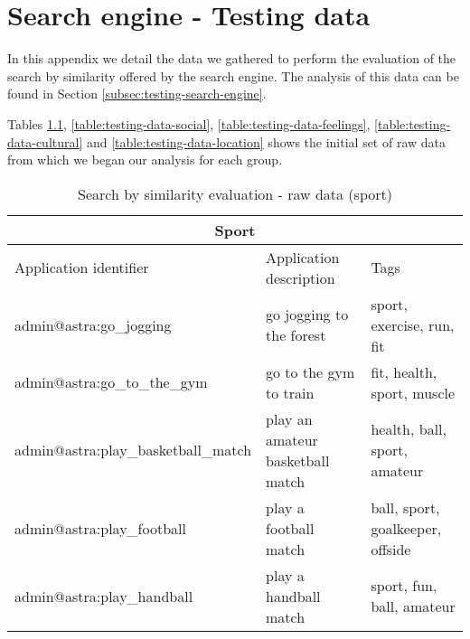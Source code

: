 \chapter{Search engine - Testing data}
\label{appendix:testing-search-engine-data}

In this appendix we detail the data we gathered to perform the evaluation of
the search by similarity offered by the search engine. The analysis of this
data can be found in Section \ref{subsec:testing-search-engine}.

Tables \ref{table:testing-data-sport}, \ref{table:testing-data-social},
\ref{table:testing-data-feelings}, \ref{table:testing-data-cultural} and
\ref{table:testing-data-location} shows the initial set of raw data from which
we began our analysis for each group.

\begin{table}[h!]
	\tiny
    \begin{center}
		\begin{tabular}{||l|l|l||}

		\hline \hline
		\multicolumn{3}{||c||}{\bfseries{Sport}} \\
		\hline \hline
			Application identifier & Application description & Tags \\
			\hline \hline
			admin@astra:go\_jogging	& go jogging to the forest & sport, exercise, run,
			fit\\
			\hline
			admin@astra:go\_to\_the\_gym & go to the gym to train & fit, health, sport,
			muscle\\
			\hline
			admin@astra:play\_basketball\_match & play an amateur basketball match &
			health, ball, sport, amateur\\
			\hline
			admin@astra:play\_football & play a football match & ball, sport, goalkeeper,
			offside\\
			\hline
			admin@astra:play\_handball & play a handball match & sport, fun, ball,
			amateur\\
		\hline \hline

		\end{tabular}
		\caption{\label{table:testing-data-sport}Search by similarity evaluation - raw
		data (sport)}
	\end{center}
\end{table} 

